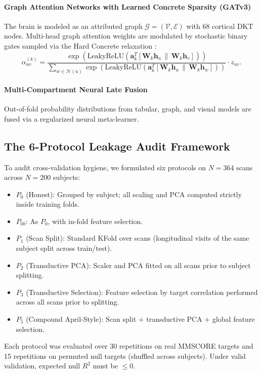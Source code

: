 \documentclass[journal,twocolumn]{IEEEtran}
\begin{document}
\paragraph{Graph Attention Networks with Learned Concrete Sparsity (GATv3)} The brain is modeled as an attributed graph $\mathcal{G} = (\mathcal{V}, \mathcal{E})$ with 68 cortical DKT nodes. Multi-head graph attention weights are modulated by stochastic binary gates sampled via the Hard Concrete relaxation \cite{louizos2017learning}:
\begin{equation}
    \alpha_{uv}^{(k)} = \frac{\exp\left(\text{LeakyReLU}\left(\mathbf{a}_k^T [\mathbf{W}_k \mathbf{h}_u \,\|\, \mathbf{W}_k \mathbf{h}_v]\right)\right)}{\sum_{w \in \mathcal{N}(u)} \exp\left(\text{LeakyReLU}\left(\mathbf{a}_k^T [\mathbf{W}_k \mathbf{h}_u \,\|\, \mathbf{W}_k \mathbf{h}_w]\right)\right)} \cdot z_{uv}.
\end{equation}
\paragraph{Multi-Compartment Neural Late Fusion} Out-of-fold probability distributions from tabular, graph, and visual models are fused via a regularized neural meta-learner.

\subsection{The 6-Protocol Leakage Audit Framework}
To audit cross-validation hygiene, we formulated six protocols on $N=364$ scans across $N=200$ subjects:
\begin{itemize}
    \item $P_0$ (Honest): Grouped by subject; all scaling and PCA computed strictly inside training folds.
    \item $P_{0b}$: As $P_0$, with in-fold feature selection.
    \item $P_1$ (Scan Split): Standard KFold over scans (longitudinal visits of the same subject split across train/test).
    \item $P_2$ (Transductive PCA): Scaler and PCA fitted on all scans prior to subject splitting.
    \item $P_3$ (Transductive Selection): Feature selection by target correlation performed across all scans prior to splitting.
    \item $P_5$ (Compound April-Style): Scan split $+$ transductive PCA $+$ global feature selection.
\end{itemize}
Each protocol was evaluated over 30 repetitions on real MMSCORE targets and 15 repetitions on permuted null targets (shuffled across subjects). Under valid validation, expected null $R^2$ must be $\le 0$.
\end{document}

